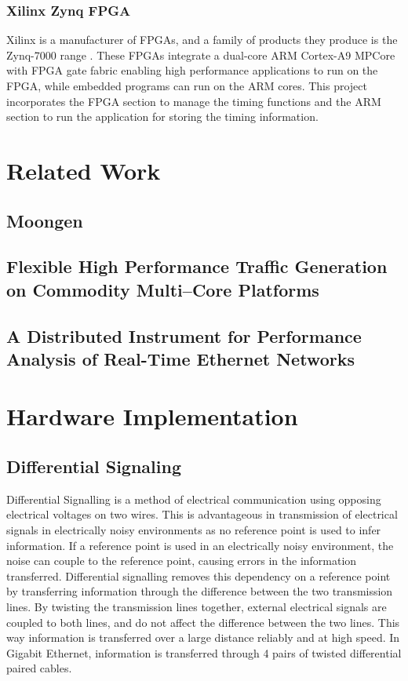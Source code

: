 \subsubsection{Xilinx Zynq FPGA}

Xilinx is a manufacturer of FPGAs, and a family of products they produce is the Zynq-7000 range \cite{fpga}.
These FPGAs integrate a dual-core ARM Cortex-A9 MPCore with FPGA gate fabric enabling high performance 
applications to run on the FPGA, while embedded programs can run on the ARM cores.
This project incorporates the FPGA section to manage the timing functions and the ARM section to run the 
application for storing the timing information.

\section{Related Work}

\subsection{Moongen}

\subsection{Flexible High Performance Traffic Generation on Commodity Multi–Core Platforms}

\subsection{A Distributed Instrument for Performance Analysis of Real-Time Ethernet Networks}

\section{Hardware Implementation}

\subsection{Differential Signaling}
Differential Signalling is a method of electrical communication using opposing electrical voltages on two wires. 
This is advantageous in transmission of electrical signals in electrically noisy environments as no reference 
point is used to infer information. If a reference point is used in an electrically noisy environment, the 
noise can couple to the reference point, causing errors in the information transferred. Differential signalling 
removes this dependency on a reference point by transferring information through the difference between the two 
transmission lines. By twisting the transmission lines together, external electrical signals are coupled to both 
lines, and do not affect the difference between the two lines. This way information is transferred over a large 
distance reliably and at high speed. In Gigabit Ethernet, information is transferred through 4 pairs of twisted 
differential paired cables.

